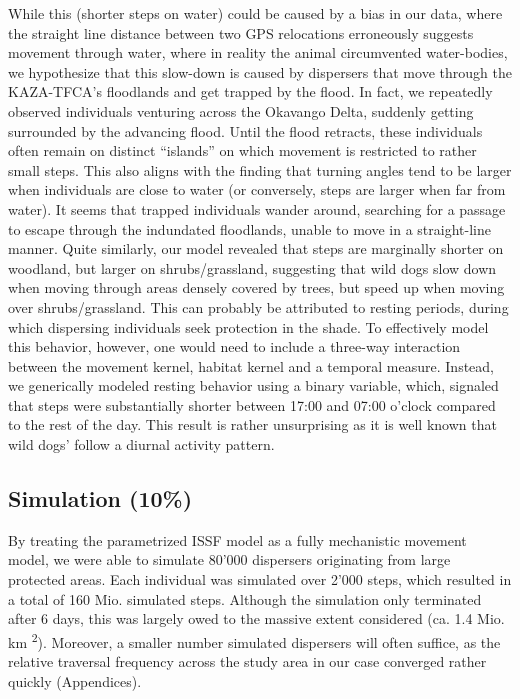 \documentclass[abstract=on,10pt,a4paper,bibliography=totocnumbered]{article}
\begin{document}
While this (shorter steps on water) could be caused by a bias in our data,
where the straight line distance between two GPS relocations erroneously
suggests movement through water, where in reality the animal circumvented
water-bodies, we hypothesize that this slow-down is caused by dispersers that
move through the KAZA-TFCA's floodlands and get trapped by the flood. In fact,
we repeatedly observed individuals venturing across the Okavango Delta,
suddenly getting surrounded by the advancing flood. Until the flood retracts,
these individuals often remain on distinct ``islands'' on which movement is
restricted to rather small steps. This also aligns with the finding that
turning angles tend to be larger when individuals are close to water (or
conversely, steps are larger when far from water). It seems that trapped
individuals wander around, searching for a passage to escape through the
indundated floodlands, unable to move in a straight-line manner. Quite
similarly, our model revealed that steps are marginally shorter on woodland,
but larger on shrubs/grassland, suggesting that wild dogs slow down when
moving through areas densely covered by trees, but speed up when moving over
shrubs/grassland. This can probably be attributed to resting periods, during
which dispersing individuals seek protection in the shade. To effectively
model this behavior, however, one would need to include a three-way
interaction between the movement kernel, habitat kernel and a temporal
measure. Instead, we generically modeled resting behavior using a binary
variable, which, signaled that steps were substantially shorter between 17:00
and 07:00 o'clock compared to the rest of the day. This result is rather
unsurprising as it is well known that wild dogs' follow a diurnal activity
pattern.

\subsection{Simulation (10\%)}
By treating the parametrized ISSF model as a fully mechanistic movement model,
we were able to simulate 80'000 dispersers originating from large protected
areas. Each individual was simulated over 2'000 steps, which resulted in a total
of 160 Mio. simulated steps. Although the simulation only terminated after 6
days, this was largely owed to the massive extent considered (ca. 1.4 Mio. km
\textsuperscript{2}). Moreover, a smaller number simulated dispersers will often
suffice, as the relative traversal frequency across the study area in our case
converged rather quickly (Appendices).
\end{document}
